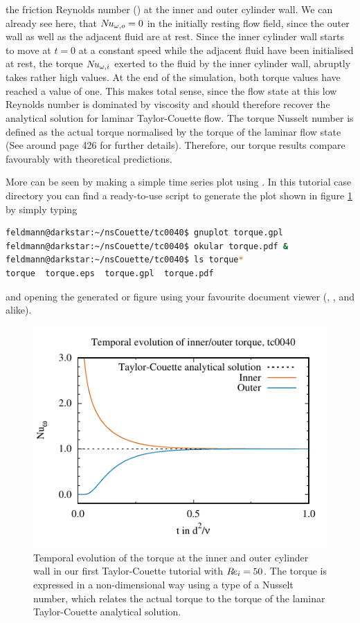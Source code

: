 \documentclass[a4paper, 11pt, DIV=11]{scrartcl}
\begin{document}
the friction Reynolds number (\ReTau) at the inner and outer cylinder wall. We can
already see here, that $N\hspace{-0.1em}u_{\omega,o}=0$ in the initially resting flow field, since the
outer wall as well as the adjacent fluid are at rest. Since the inner cylinder
wall starts to move at $t=0$ at a constant speed while the adjacent fluid have
been initialised at rest, the torque $N\hspace{-0.1em}u_{\omega,i}$ exerted to the fluid by the inner
cylinder wall, abruptly takes rather high values. At the end of the simulation,
both torque values have reached a value of one. This makes total sense, since the
flow state at this low Reynolds number is dominated by viscosity and should
therefore recover the analytical solution for laminar Taylor-Couette flow. The
torque Nusselt number is defined as the actual torque normalised by the torque of
the laminar flow state (See %
\eg \cite{Brauckmann2016} around page \num{426} for further details). 
Therefore, our torque results compare favourably with theoretical predictions. 
\par More can be seen by making a simple time series plot using \eg 
\gnuplot. In this tutorial case directory you can find a ready-to-use 
script to generate the plot shown in figure \ref{fig:tc0040torque} by simply 
typing
\begin{lstlisting}[language=bash]
feldmann@darkstar:~/nsCouette/tc0040$ gnuplot torque.gpl
feldmann@darkstar:~/nsCouette/tc0040$ okular torque.pdf &
feldmann@darkstar:~/nsCouette/tc0040$ ls torque*
torque	torque.eps  torque.gpl	torque.pdf
\end{lstlisting}
and opening the generated  or  figure using your
favourite document  viewer (\eg {}, , 
and alike).
\begin{figure}[htb]
\centering
\includegraphics[scale=1.0, trim=0mm 0mm 0mm 6mm, clip=true]{figures/tc0040/torque}
\caption{Temporal evolution of the torque at the inner and outer cylinder
wall in our first Taylor-Couette tutorial  with $R\hspace{-0.1em}e_{i}=\num{50}$.
The torque is expressed in a non-dimensional way using a type of a Nusselt
number, which relates the actual torque to the torque of the laminar
Taylor-Couette analytical solution.}
\label{fig:tc0040torque}
\end{figure}
\end{document}
